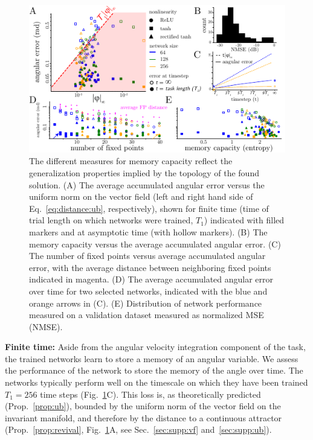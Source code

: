 \documentclass{article} %
\newcommand{\ptitle}[1]{\textbf{#1:}\xspace}
\newcounter{ct}
\theoremstyle{definition}
\theoremstyle{remark}
\begin{document}
\begin{figure}[tbhp]
  \centering
  \includegraphics[width=\textwidth]{angular_losses_s}
  \caption{The different measures for memory capacity reflect the generalization properties implied by the topology of the found solution.
  (A) The average accumulated angular error versus the uniform norm on the vector field (left and right hand side of Eq.~\ref{eq:distance:ub}, respectively), shown for finite time (time of trial length on which networks were trained, \(T_{1}\)) indicated with filled markers and at asymptotic time (with hollow markers).
  (B) The memory capacity versus the average accumulated angular error.
  (C) The number of fixed points versus average accumulated angular error, with the average distance between neighboring fixed points indicated in magenta.
  (D) The average accumulated angular error over time for two selected networks, indicated with the blue and orange arrows in (C).
  (E) Distribution of network performance measured on a validation dataset measured as normalized MSE (NMSE).
  }\label{fig:angular_loss}
\end{figure}

\vspace{-.5cm}
\ptitle{Finite time}
Aside from the angular velocity integration component of the task, the trained networks learn to store a memory of an angular variable.
We assess the performance of the network to store the memory of the angle over time.
The networks typically perform well on the timescale on which they have been trained \(T_{1} = 256\) time steps (Fig.~\ref{fig:angular_loss}C).
This loss is, as theoretically predicted (Prop.~\ref{prop:ub}), bounded by the uniform norm of the vector field on the invariant manifold, and therefore by the distance to a continuous attractor (Prop.~\ref{prop:revival}, Fig.~\ref{fig:angular_loss}A,  see Sec.~\ref{sec:supp:vf} and~\ref{sec:supp:ub}).
\end{document}
